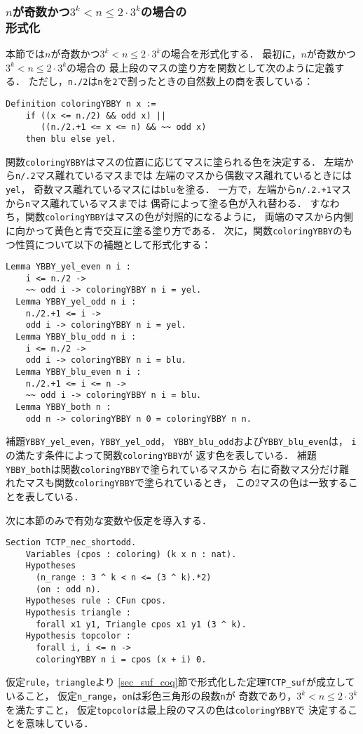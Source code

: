\subsubsection{$n$が奇数かつ$3^{k} < n \leq 2 \cdot 3^{k}$の場合の\\形式化}
本節では$n$が奇数かつ$3^{k} < n \leq 2 \cdot 3^{k}$の場合を形式化する．
最初に，$n$が奇数かつ$3^{k} < n \leq 2 \cdot 3^{k}$の場合の
最上段のマスの塗り方を関数として次のように定義する．
ただし，{\tt{n./2}}は{\tt{n}}を{\tt{2}}で割ったときの自然数上の商を表している：
\begin{lstlisting}[language=Coq]
  Definition coloringYBBY n x :=
    if ((x <= n./2) && odd x) ||
       ((n./2.+1 <= x <= n) && ~~ odd x)
    then blu else yel.
\end{lstlisting}
関数{\tt{coloringYBBY}}はマスの位置に応じてマスに塗られる色を決定する．
左端から{\tt{n/.2}}マス離れているマスまでは
左端のマスから偶数マス離れているときには{\tt{yel}}，
奇数マス離れているマスには{\tt{blu}}を塗る．
一方で，左端から{\tt{n/.2.+1}}マスから{\tt{n}}マス離れているマスまでは
偶奇によって塗る色が入れ替わる．
すなわち，関数{\tt{coloringYBBY}}はマスの色が対照的になるように，
両端のマスから内側に向かって黄色と青で交互に塗る塗り方である．
次に，関数{\tt{coloringYBBY}}のもつ性質について以下の補題として形式化する：
\begin{lstlisting}[language=Coq]
  Lemma YBBY_yel_even n i :
    i <= n./2 ->
    ~~ odd i -> coloringYBBY n i = yel.
  Lemma YBBY_yel_odd n i :
    n./2.+1 <= i ->
    odd i -> coloringYBBY n i = yel.
  Lemma YBBY_blu_odd n i :
    i <= n./2 ->
    odd i -> coloringYBBY n i = blu.
  Lemma YBBY_blu_even n i :
    n./2.+1 <= i <= n ->
    ~~ odd i -> coloringYBBY n i = blu.
  Lemma YBBY_both n :
    odd n -> coloringYBBY n 0 = coloringYBBY n n.
\end{lstlisting}
補題{\tt{YBBY\_yel\_even}}，{\tt{YBBY\_yel\_odd}}，
{\tt{YBBY\_blu\_odd}}および{\tt{YBBY\_blu\_even}}は，
{\tt{i}}の満たす条件によって関数{\tt{coloringYBBY}}が
返す色を表している．
補題{\tt{YBBY\_both}}は関数{\tt{coloringYBBY}}で塗られているマスから
右に奇数マス分だけ離れたマスも関数{\tt{coloringYBBY}}で塗られているとき，
この2マスの色は一致することを表している．

次に本節のみで有効な変数や仮定を導入する．
\begin{lstlisting}[language=Coq]
  Section TCTP_nec_shortodd.
    Variables (cpos : coloring) (k x n : nat).
    Hypotheses
      (n_range : 3 ^ k < n <= (3 ^ k).*2)
      (on : odd n).
    Hypotheses rule : CFun cpos.
    Hypothesis triangle :
      forall x1 y1, Triangle cpos x1 y1 (3 ^ k).
    Hypothesis topcolor :
      forall i, i <= n ->
      coloringYBBY n i = cpos (x + i) 0.
\end{lstlisting}
仮定{\tt{rule}}，{\tt{triangle}}より
\ref{sec_suf_coq}節で形式化した定理{\tt{TCTP\_suf}}が成立していること，
仮定{\tt{n\_range}}，{\tt{on}}は彩色三角形の段数{\tt{n}}が
奇数であり，$3^{k} < n \leq 2 \cdot 3^{k}$を満たすこと，
仮定{\tt{topcolor}}は最上段のマスの色は{\tt{coloringYBBY}}で
決定することを意味している．

